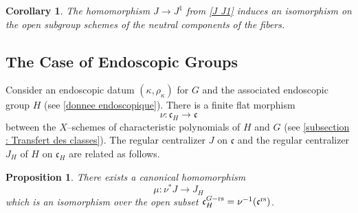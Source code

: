 \documentclass[12pt,english]{smfart}
\numberwithin{equation}{subsection}
\newtheorem{proposition}[equation]{Proposition}
\newtheorem{corollary}[equation]{Corollary}
\theoremstyle{remark}
\newcommand\rs{{\rm rs}}
\begin{document}
\begin{corollary}\label{isom sur composantes neutres}
The homomorphism $J\to J^1$ from \ref{J J1} induces an isomorphism on the open subgroup schemes of the neutral components of the fibers.
\end{corollary}

\subsection{The Case of Endoscopic Groups}
Consider an endoscopic datum $(\kappa,\rho_\kappa)$ for $G$ and the associated endoscopic group $H$ (see \ref{donnee endoscopique}). There is a finite flat morphism
$$
\nu:\mathfrak{c}_H\to \mathfrak{c}
$$
between the $X$--schemes of characteristic polynomials of $H$ and $G$ (see \ref{subsection : Transfert des classes}). The regular centralizer $J$ on $\mathfrak{c}$ and the regular centralizer $J_H$ of $H$ on $\mathfrak{c}_H$ are related as follows.

\begin{proposition}\label{J JH}
There exists a canonical homomorphism
$$
\mu:\nu^* J \to J_H
$$
which is an isomorphism over the open subset $\mathfrak{c}_H^{G-\rs}=\nu^{-1}(\mathfrak{c}^\rs)$.
\end{proposition}
\end{document}
